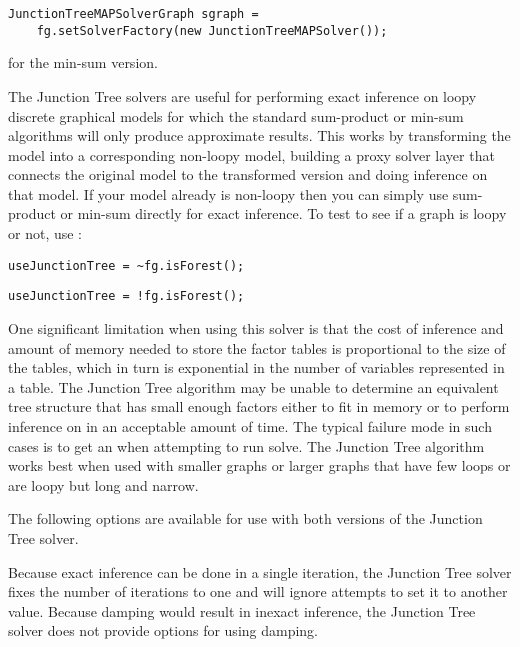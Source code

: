 \ifjava
\begin{lstlisting}
JunctionTreeMAPSolverGraph sgraph =
    fg.setSolverFactory(new JunctionTreeMAPSolver());
\end{lstlisting}
\fi

for the min-sum version.

The Junction Tree solvers are useful for performing exact inference on loopy discrete graphical models for which the standard sum-product or min-sum algorithms will only produce approximate results. This works by transforming the model into a corresponding non-loopy model, building a proxy solver layer that connects the original model to the transformed version and doing inference on that model. If your model already is non-loopy then you can simply use sum-product or min-sum directly for exact inference. To test to see if a graph is loopy or not, use :

\ifmatlab
\begin{lstlisting}
useJunctionTree = ~fg.isForest();
\end{lstlisting}
\fi

\ifjava
\begin{lstlisting}
useJunctionTree = !fg.isForest();
\end{lstlisting}
\fi

One significant limitation when using this solver is that the cost of inference and amount of memory needed to store the factor tables is proportional to the size of the tables, which in turn is exponential in the number of variables represented in a table. The Junction Tree algorithm may be unable to determine an equivalent tree structure that has small enough factors either to fit in memory or to perform inference on in an acceptable amount of time. The typical failure mode in such cases is to get an  when attempting to run solve. The Junction Tree algorithm works best when used with smaller graphs or larger graphs that have few loops or are loopy but long and narrow.

\label{sec:JunctionTreeOptions}

The following options are available for use with both versions of the Junction Tree solver.

Because exact inference can be done in a single iteration, the Junction Tree solver fixes the number of iterations to one and will ignore attempts to set it to another value. Because damping would result in inexact inference, the Junction Tree solver does not provide options for using damping.

